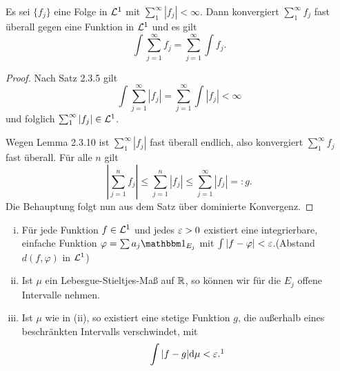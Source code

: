 
\begin{thm}
 Es sei $\{ f_j \}$ eine Folge in $\mathcal{L}^1$ mit $\sum_1^\infty |f_j| < \infty$. Dann konvergiert $\sum_1^\infty f_j$ fast überall gegen eine Funktion in $\mathcal{L}^1$ und es gilt
 \[ \int \sum_{j=1}^\infty f_j = \sum_{j=1}^\infty \int f_j. \]
\end{thm}

\begin{proof}
 Nach Satz 2.3.5 gilt
 \[ \int \sum_{j=1}^\infty | f_j | = \sum_{j=1}^\infty \int |f_j| < \infty \]
 und folglich $\sum_1^\infty | f_j | \in \mathcal{L}^1$.
 
 Wegen Lemma 2.3.10 ist $\sum_1^\infty |f_j|$ fast überall endlich, also konvergiert $\sum_1^\infty f_j$ fast überall.  Für alle $n$ gilt
 \[ \left| \sum_{j=1}^n f_j \right| \le \sum_{j=1}^n | f_j | \le \sum_{j=1}^\infty |f_j| =: g. \]
 Die Behauptung folgt nun aus dem Satz über dominierte Konvergenz.
\end{proof}

\begin{thm}\label{thm:2-5-11}
 \begin{enumerate}[(i)]
  \item Für jede Funktion $f \in \mathcal{L}^1$ und jedes $\varepsilon > 0$ existiert eine integrierbare, einfache Funktion $\varphi = \sum a_j \ind_{E_j}$ mit $\int | f -\varphi | < \varepsilon$.\footnotemark (Abstand $d(f,\varphi)$ in $\mathcal{L}^1$)
  \item Ist $\mu$ ein Lebesgue-Stieltjes-Maß auf $\mathbb{R}$, so können wir für die $E_j$ offene Intervalle nehmen.
  \item Ist $\mu$ wie in (ii), so existiert eine stetige Funktion $g$, die außerhalb eines beschränkten Intervalls verschwindet\footnotemark, mit
  \[ \int |f-g| \diffop \mu < \eps.\footnotemark \]
 \end{enumerate}

\end{thm}
\addtocounter{footnote}{-3} %

